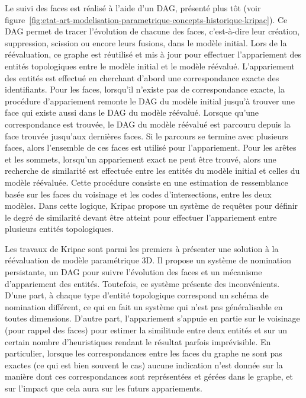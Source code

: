 Le suivi des faces est réalisé à l'aide d'un DAG, présenté plus tôt (voir
figure~\ref{fig:etat-art-modelisation-parametrique-concepts-historique-kripac}). %
Ce DAG permet de tracer l'évolution de chacune des faces, c'est-à-dire leur
création, suppression, scission ou encore leurs fusions, dans le modèle
initial. %
Lors de la réévaluation, ce graphe est réutilisé et mis à jour pour effectuer
l'appariement des entités topologiques entre le modèle initial et le modèle
réévalué. %
L'appariement des entités est effectué en cherchant d'abord une correspondance
exacte des identifiants. %
Pour les faces, lorsqu'il n'existe pas de correspondance exacte, la procédure
d'appariement remonte le DAG du modèle initial jusqu'à trouver une face qui
existe aussi dans le DAG du modèle réévalué. %
Lorsque qu'une correspondance est trouvée, le DAG du modèle réévalué est
parcouru depuis la face trouvée jusqu'aux dernières faces. %
Si le parcours se termine avec plusieurs faces, alors l'ensemble de ces faces
est utilisé pour l'appariement. %
Pour les arêtes et les sommets, lorsqu'un appariement exact ne peut être trouvé,
alors une recherche de similarité est effectuée entre les entités du modèle
initial et celles du modèle réévaluée. %
Cette procédure consiste en une estimation de ressemblance basée sur les faces
du voisinage et les codes d'intersections, entre les deux modèles. %
Dans cette logique, Kripac propose un système de requêtes pour définir le degré de
similarité devant être atteint pour effectuer l'appariement entre plusieurs
entités topologiques. %

Les travaux de Kripac sont parmi les premiers à présenter une solution à la
réévaluation de modèle paramétrique 3D. %
Il propose un système de nomination persistante, un DAG pour suivre l'évolution
des faces et un mécanisme d'appariement des entités. %
Toutefois, ce système présente des inconvénients. %
D'une part, à chaque type d'entité topologique correspond un schéma de
nomination différent, ce qui en fait un système qui n'est pas généralisable en
toutes dimensions. %
D'autre part, l'appariement s'appuie en partie sur le voisinage (pour rappel des
faces) pour estimer la similitude entre deux entités et sur un certain nombre
d'heuristiques rendant le résultat parfois imprévisible. %
En particulier, lorsque les correspondances entre les faces du graphe ne sont pas
exactes (ce qui est bien souvent le cas) aucune indication n'est donnée sur la
manière dont ces correspondances sont représentées et gérées dans le graphe, et
sur l'impact que cela aura sur les futurs appariements. %


